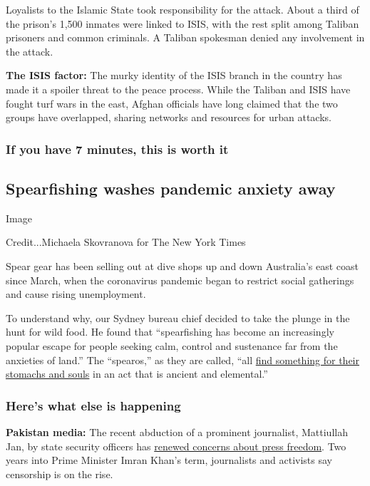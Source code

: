 Loyalists to the Islamic State took responsibility for the attack. About
a third of the prison's 1,500 inmates were linked to ISIS, with the rest
split among Taliban prisoners and common criminals. A Taliban spokesman
denied any involvement in the attack.

\textbf{The ISIS factor:} The murky identity of the ISIS branch in the
country has made it a spoiler threat to the peace process. While the
Taliban and ISIS have fought turf wars in the east, Afghan officials
have long claimed that the two groups have overlapped, sharing networks
and resources for urban attacks.

\hypertarget{if-you-have-7-minutes-this-is-worth-it}{%
\subsubsection{If you have 7 minutes, this is worth
it}\label{if-you-have-7-minutes-this-is-worth-it}}

\hypertarget{spearfishing-washes-pandemic-anxiety-away}{%
\subsection{Spearfishing washes pandemic anxiety
away}\label{spearfishing-washes-pandemic-anxiety-away}}

Image

Credit...Michaela Skovranova for The New York Times

Spear gear has been selling out at dive shops up and down Australia's
east coast since March, when the coronavirus pandemic began to restrict
social gatherings and cause rising unemployment.

To understand why, our Sydney bureau chief decided to take the plunge in
the hunt for wild food. He found that ``spearfishing has become an
increasingly popular escape for people seeking calm, control and
sustenance far from the anxieties of land.'' The ``spearos,'' as they
are called, ``all
\href{https://www.nytimes.com/2020/08/03/world/australia/spearfishing-sydney-coronavirus.html}{find
something for their stomachs and souls} in an act that is ancient and
elemental.''

\hypertarget{heres-what-else-is-happening}{%
\subsubsection{Here's what else is
happening}\label{heres-what-else-is-happening}}

\textbf{Pakistan media:} The recent abduction of a prominent journalist,
Mattiullah Jan, by state security officers has
\href{https://www.nytimes.com/2020/08/03/world/asia/pakistan-media-abductions.html}{renewed
concerns about press freedom}. Two years into Prime Minister Imran
Khan's term, journalists and activists say censorship is on the rise.

